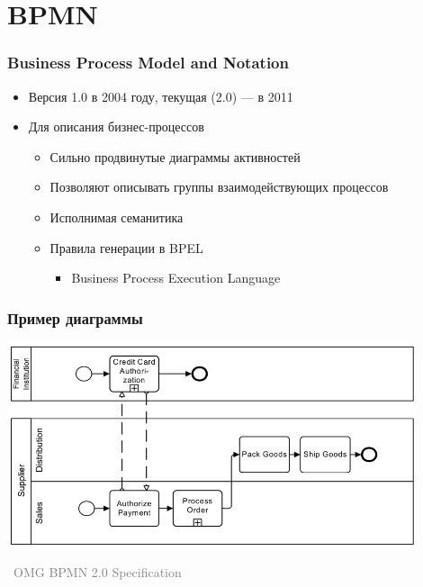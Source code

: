 \documentclass[xetex,mathserif,serif]{beamer}
\newcommand{\attribution}[1] {
	\vspace{-5mm}\begin{flushright}\begin{scriptsize}\textcolor{gray}{\textcopyright\, #1}\end{scriptsize}\end{flushright}
}
\begin{document}
	\section{BPMN}

	\begin{frame}
		\frametitle{Business Process Model and Notation}
		\begin{itemize}
			\item Версия 1.0 в 2004 году, текущая (2.0) --- в 2011
			\item Для описания бизнес-процессов
			\begin{itemize}
				\item Сильно продвинутые диаграммы активностей
				\item Позволяют описывать группы взаимодействующих процессов
				\item Исполнимая семанитика
				\item Правила генерации в BPEL
				\begin{itemize}
					\item Business Process Execution Language
				\end{itemize}
			\end{itemize}
		\end{itemize}
	\end{frame}

	\begin{frame}
		\frametitle{Пример диаграммы}
		\begin{center}
			\includegraphics[width=0.9\textwidth]{bpmnExample.png}
			\attribution{OMG BPMN 2.0 Specification}
		\end{center}
	\end{frame}
\end{document}
